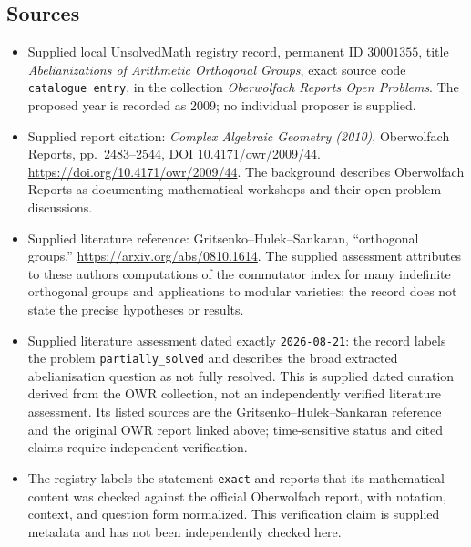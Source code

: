 \documentclass[11pt]{article}
\begin{document}
\subsection{Sources}
\begin{itemize}
\item Supplied local UnsolvedMath registry record, permanent ID \(30001355\), title \emph{Abelianizations of Arithmetic Orthogonal Groups}, exact source code \texttt{catalogue entry}, in the collection \emph{Oberwolfach Reports Open Problems}. The proposed year is recorded as 2009; no individual proposer is supplied.
\item Supplied report citation: \emph{Complex Algebraic Geometry (2010)}, Oberwolfach Reports, pp.\ 2483--2544, DOI 10.4171/owr/2009/44. \url{https://doi.org/10.4171/owr/2009/44}. The background describes Oberwolfach Reports as documenting mathematical workshops and their open-problem discussions.
\item Supplied literature reference: Gritsenko--Hulek--Sankaran, ``orthogonal groups.'' \url{https://arxiv.org/abs/0810.1614}. The supplied assessment attributes to these authors computations of the commutator index for many indefinite orthogonal groups and applications to modular varieties; the record does not state the precise hypotheses or results.
\item Supplied literature assessment dated exactly \texttt{2026-08-21}: the record labels the problem \texttt{partially\_solved} and describes the broad extracted abelianisation question as not fully resolved. This is supplied dated curation derived from the OWR collection, not an independently verified literature assessment. Its listed sources are the Gritsenko--Hulek--Sankaran reference and the original OWR report linked above; time-sensitive status and cited claims require independent verification.
\item The registry labels the statement \texttt{exact} and reports that its mathematical content was checked against the official Oberwolfach report, with notation, context, and question form normalized. This verification claim is supplied metadata and has not been independently checked here.
\end{itemize}
\end{document}
